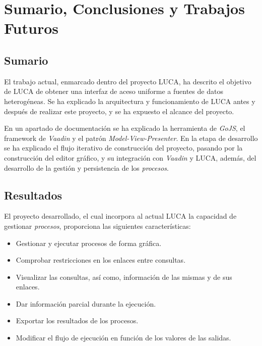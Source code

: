 \chapter{Sumario, Conclusiones y Trabajos Futuros}


\section{Sumario}

El trabajo actual, enmarcado dentro del proyecto LUCA, ha descrito el objetivo de LUCA de obtener una interfaz de aceso uniforme a fuentes de datos heterogéneas. Se ha explicado la arquitectura y funcionamiento de LUCA antes y después de realizar este proyecto, y se ha expuesto el alcance del proyecto.

En un apartado de documentación se ha explicado la herramienta de \emph{GoJS}, el framework de \emph{Vaadin} y el patrón \emph{Model-View-Presenter}. En la etapa de desarrollo se ha explicado el flujo iterativo de construcción del proyecto, pasando por la construcción del editor gráfico, y su integración con \emph{Vaadin} y LUCA, además, del desarrollo de la gestión y persistencia de los \emph{procesos}.

\section{Resultados}

El proyecto desarrollado, el cual incorpora al actual LUCA la capacidad de gestionar \emph{procesos}, proporciona las siguientes características:
\begin{itemize}
	\item Gestionar y ejecutar procesos de forma gráfica.
	\item Comprobar restricciones en los enlaces entre consultas.
	\item Visualizar las consultas, así como, información de las mismas y de sus enlaces.
	\item Dar información parcial durante la ejecución.
	\item Exportar los resultados de los procesos.
	\item Modificar el flujo de ejecución en función de los valores de las salidas.
\end{itemize}

